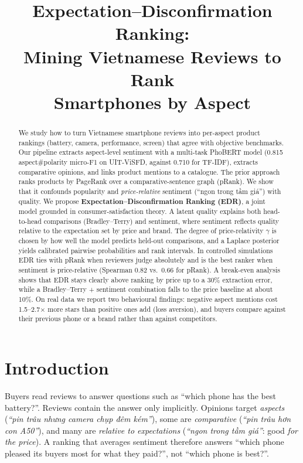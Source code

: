 \documentclass{article}
\title{Expectation--Disconfirmation Ranking:\\Mining Vietnamese Reviews to Rank\\Smartphones by Aspect}
\author{\groupauthors}
\begin{document}
\maketitle
{}

\begin{abstract}
We study how to turn Vietnamese smartphone reviews into per-aspect product rankings (battery, camera, performance, screen)
that agree with objective benchmarks. Our pipeline extracts aspect-level sentiment with a multi-task PhoBERT model (0.815
aspect\#polarity micro-F1 on UIT-ViSFD, against 0.710 for TF-IDF), extracts comparative opinions, and links product mentions to a catalogue.
The prior approach ranks products by PageRank over a comparative-sentence graph (pRank). We show that it confounds popularity and
\emph{price-relative} sentiment (``ngon trong tầm giá'') with quality. We propose \textbf{Expectation--Disconfirmation Ranking (EDR)},
a joint model grounded in consumer-satisfaction theory. A latent quality explains both head-to-head comparisons (Bradley--Terry)
and sentiment, where sentiment reflects quality relative to the expectation set by price and brand. The degree of price-relativity
$\gamma$ is chosen by how well the model predicts held-out comparisons, and a Laplace posterior yields calibrated pairwise probabilities and rank intervals.
In controlled simulations EDR ties with pRank when reviewers judge absolutely and is the best ranker when sentiment is price-relative
(Spearman 0.82 vs.\ 0.66 for pRank). A break-even analysis shows that EDR stays clearly above ranking by price up to a 30\% extraction
error, while a Bradley--Terry + sentiment combination falls to the price baseline at about 10\%. On real data we report two behavioural findings: negative aspect mentions cost 1.5--2.7$\times$ more stars
than positive ones add (loss aversion), and buyers compare against their previous phone or a brand rather than against competitors.
\end{abstract}

\section{Introduction}
Buyers read reviews to answer questions such as ``which phone has the best battery?''. Reviews contain the answer only implicitly.
Opinions target \emph{aspects} (\emph{``pin trâu nhưng camera chụp đêm kém''}), some are \emph{comparative}
(\emph{``pin trâu hơn con A50''}), and many are \emph{relative to expectations} (\emph{``ngon trong tầm giá''}: good \emph{for the price}).
A ranking that averages sentiment therefore answers ``which phone pleased its buyers most for what they paid?'', not ``which phone is best?''.
\end{document}
